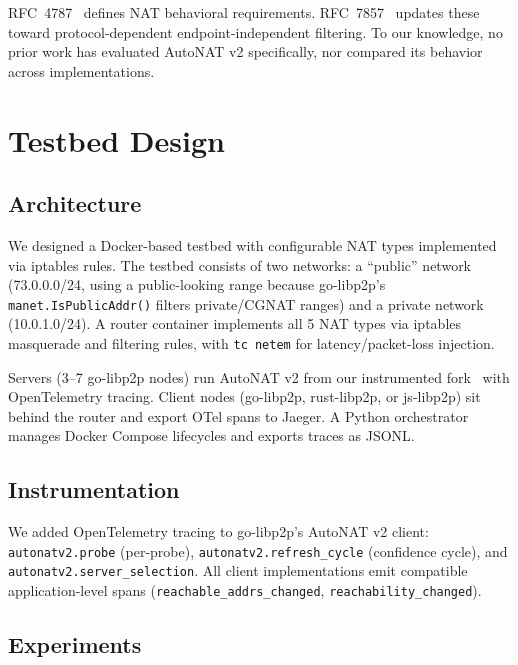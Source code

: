 \documentclass[conference]{IEEEtran}
\begin{document}
RFC~4787~\cite{rfc4787} defines NAT behavioral requirements. RFC~7857~\cite{rfc7857} updates these toward protocol-dependent endpoint-independent filtering. To our knowledge, no prior work has evaluated AutoNAT v2 specifically, nor compared its behavior across implementations.

\section{Testbed Design}

\subsection{Architecture}

We designed a Docker-based testbed with configurable NAT types implemented via iptables rules. The testbed consists of two networks: a ``public'' network (73.0.0.0/24, using a public-looking range because go-libp2p's \texttt{manet.IsPublicAddr()} filters private/CGNAT ranges) and a private network (10.0.1.0/24). A router container implements all 5 NAT types via iptables masquerade and filtering rules, with \texttt{tc netem} for latency/packet-loss injection.

Servers (3--7 go-libp2p nodes) run AutoNAT v2 from our instrumented fork~\cite{probelab-fork} with OpenTelemetry tracing. Client nodes (go-libp2p, rust-libp2p, or js-libp2p) sit behind the router and export OTel spans to Jaeger. A Python orchestrator manages Docker Compose lifecycles and exports traces as JSONL.

\subsection{Instrumentation}

We added OpenTelemetry tracing to go-libp2p's AutoNAT v2 client: \texttt{autonatv2.probe} (per-probe), \texttt{autonatv2.refresh\_cycle} (confidence cycle), and \texttt{autonatv2.server\_selection}. All client implementations emit compatible application-level spans (\texttt{reachable\_addrs\_changed}, \texttt{reachability\_changed}).

\subsection{Experiments}
\end{document}
